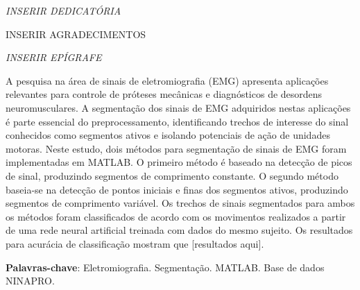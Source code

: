\documentclass[
	12pt,				%
	openright,			%
	oneside,
	a4paper,			%
	english,			%
	francais,				%
	spanish,			%
	brazil				%
	]{abntex2}
\begin{document}
\begin{dedicatoria}
   \vspace*{\fill}
   \centering
   \noindent
   \textit{ INSERIR DEDICATÓRIA } \vspace*{\fill}
\end{dedicatoria}

\begin{agradecimentos}
INSERIR AGRADECIMENTOS
\end{agradecimentos}

\begin{epigrafe}
    \vspace*{\fill}
	\begin{flushright}
		\textit{ INSERIR EPÍGRAFE }
	\end{flushright}
\end{epigrafe}


\setlength{\absparsep}{18pt} %
\begin{resumo}
 A pesquisa na área de sinais de eletromiografia (EMG) apresenta aplicações relevantes para controle de próteses mecânicas e diagnósticos de desordens neuromusculares. A segmentação dos sinais de EMG adquiridos nestas aplicações é parte essencial do preprocessamento, identificando trechos de interesse do sinal conhecidos como segmentos ativos e isolando potenciais de ação de unidades motoras. Neste estudo, dois métodos para segmentação de sinais de EMG foram implementadas em MATLAB. O primeiro método é baseado na detecção de picos de sinal, produzindo segmentos de comprimento constante. O segundo método baseia-se na detecção de pontos iniciais e finas dos segmentos ativos, produzindo segmentos de comprimento variável. Os trechos de sinais segmentados para ambos os métodos foram classificados de acordo com os movimentos realizados a partir de uma rede neural artificial treinada com dados do mesmo sujeito. Os resultados para acurácia de classificação mostram que [resultados aqui]. 

 \textbf{Palavras-chave}: Eletromiografia. Segmentação. MATLAB. Base de dados NINAPRO.
\end{resumo}
\end{document}
